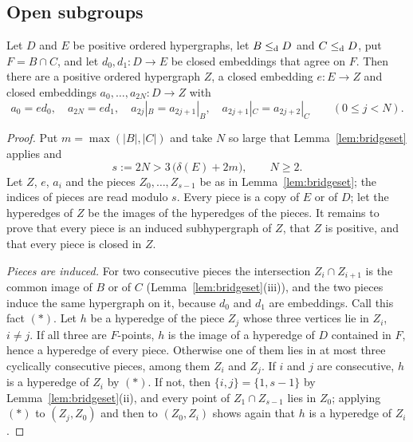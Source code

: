 \subsection{Open subgroups}

\begin{lemma}\label{lem:bridgedelta}
Let $D$ and $E$ be positive ordered hypergraphs, let $B\leq_{\mathrm{d}} D$ and $C\leq_{\mathrm{d}} D$,
put $F=B\cap C$, and let $d_0,d_1\colon D\to E$ be closed embeddings that agree
on $F$. Then there are a positive ordered hypergraph $Z$, a closed embedding
$e\colon E\to Z$ and closed embeddings $a_0,\dots,a_{2N}\colon D\to Z$ with
\[
 a_0=ed_0,\quad a_{2N}=ed_1,\quad a_{2j}|_B=a_{2j+1}|_B,\quad
 a_{2j+1}|_C=a_{2j+2}|_C\qquad(0\le j<N).
\]
\end{lemma}

\begin{proof}
Put $m=\max(|B|,|C|)$ and take $N$ so large that Lemma~\ref{lem:bridgeset}
applies and
\begin{equation}\label{eq:Nbound}
 s:=2N>3\,\bigl(\delta(E)+2m\bigr),\qquad N\ge 2 .
\end{equation}
Let $Z$, $e$, $a_i$ and the pieces $Z_0,\dots,Z_{s-1}$ be as in
Lemma~\ref{lem:bridgeset}; the indices of pieces are read modulo $s$. Every
piece is a copy of $E$ or of $D$; let the hyperedges of $Z$ be the images of
the hyperedges of the pieces. It remains to prove that every piece is an
induced subhypergraph of $Z$, that $Z$ is positive, and that every piece is
closed in $Z$.

\emph{Pieces are induced.} For two consecutive pieces the intersection
$Z_i\cap Z_{i+1}$ is the common image of $B$ or of $C$ (Lemma~\ref{lem:bridgeset}(iii)), and the two pieces induce
the same hypergraph on it, because $d_0$ and $d_1$ are embeddings. Call this
fact $(\ast)$. Let $h$ be a hyperedge of the piece $Z_j$ whose three vertices lie in
$Z_i$, $i\ne j$. If all three are $F$-points, $h$ is the image of a hyperedge
of $D$ contained in $F$, hence a hyperedge of every piece. Otherwise one of
them lies in at most three cyclically consecutive pieces, among them $Z_i$ and
$Z_j$. If $i$ and $j$ are consecutive, $h$ is a hyperedge of $Z_i$ by $(\ast)$.
If not, then $\{i,j\}=\{1,s-1\}$ by Lemma~\ref{lem:bridgeset}(ii), and every
point of $Z_1\cap Z_{s-1}$ lies in $Z_0$; applying $(\ast)$ to $(Z_j,Z_0)$ and
then to $(Z_0,Z_i)$ shows again that $h$ is a hyperedge of $Z_i$.


\end{proof}
